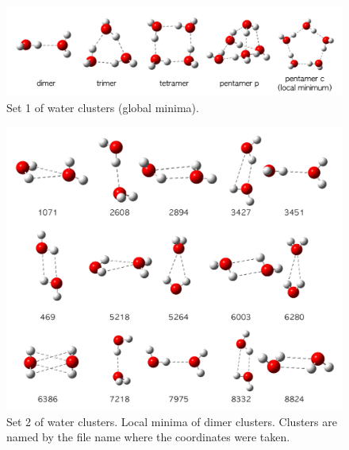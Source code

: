 \begin{figure}[!hp]
  \centering
  \includegraphics[width=1\textwidth]{4/plots/dibujitos/set1}
  \caption{Set 1 of water clusters (global minima).}
  \label{Set1}
\end{figure}
\begin{figure}[!hp]
  \centering
  \includegraphics[width=1\textwidth]{4/plots/dibujitos/set2}
  \caption{Set 2 of water clusters. Local minima of dimer clusters. Clusters
  are named by the file name where the coordinates were taken.}
  \label{Set2}
\end{figure}
